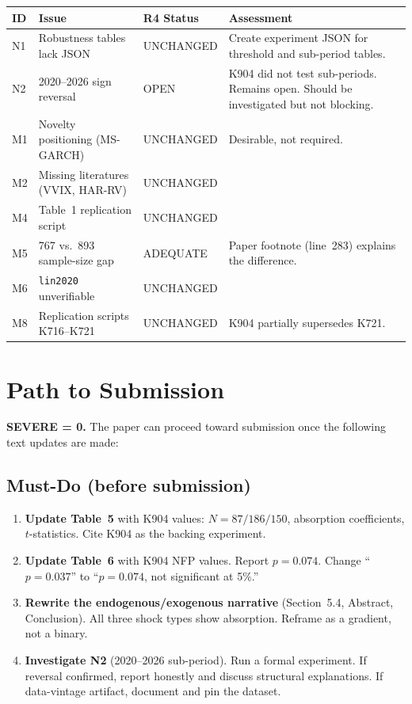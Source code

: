 \documentclass[12pt,a4paper]{article}
\begin{document}
\begin{longtable}{p{1cm}p{4.5cm}p{2.5cm}p{6cm}}
\toprule
\textbf{ID} & \textbf{Issue} & \textbf{R4 Status} & \textbf{Assessment} \\
\midrule
\endfirsthead
N1 & Robustness tables lack JSON & \textcolor{warncolor}{UNCHANGED} & Create experiment JSON for threshold and sub-period tables. \\
\addlinespace
N2 & 2020--2026 sign reversal & \textcolor{warncolor}{OPEN} & K904 did not test sub-periods. Remains open. Should be investigated but not blocking. \\
\addlinespace
M1 & Novelty positioning (MS-GARCH) & \textcolor{warncolor}{UNCHANGED} & Desirable, not required. \\
\addlinespace
M2 & Missing literatures (VVIX, HAR-RV) & \textcolor{warncolor}{UNCHANGED} & \\
\addlinespace
M4 & Table~1 replication script & \textcolor{warncolor}{UNCHANGED} & \\
\addlinespace
M5 & 767 vs.\ 893 sample-size gap & \textcolor{okgreen}{ADEQUATE} & Paper footnote (line~283) explains the difference. \\
\addlinespace
M6 & \texttt{lin2020} unverifiable & \textcolor{warncolor}{UNCHANGED} & \\
\addlinespace
M8 & Replication scripts K716--K721 & \textcolor{warncolor}{UNCHANGED} & K904 partially supersedes K721. \\
\bottomrule
\end{longtable}

\bigskip

\section*{Path to Submission}

\textbf{SEVERE = 0.} The paper can proceed toward submission once the following text updates are made:

\subsection*{Must-Do (before submission)}
\begin{enumerate}
\item \textbf{Update Table~5} with K904 values: $N = 87/186/150$, absorption coefficients, $t$-statistics. Cite K904 as the backing experiment.
\item \textbf{Update Table~6} with K904 NFP values. Report $p = 0.074$. Change ``$p = 0.037$'' to ``$p = 0.074$, not significant at 5\%.''
\item \textbf{Rewrite the endogenous/exogenous narrative} (Section~5.4, Abstract, Conclusion). All three shock types show absorption. Reframe as a gradient, not a binary.
\item \textbf{Investigate N2} (2020--2026 sub-period). Run a formal experiment. If reversal confirmed, report honestly and discuss structural explanations. If data-vintage artifact, document and pin the dataset.
\end{enumerate}
\end{document}
